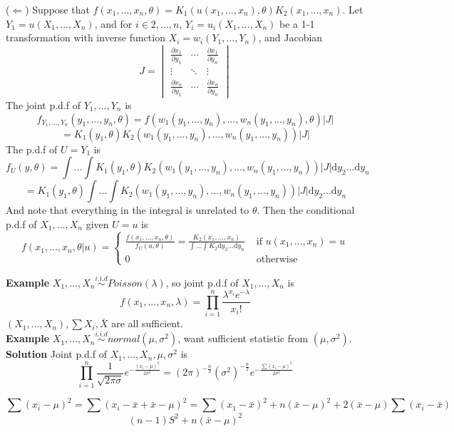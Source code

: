 \documentclass[a4paper,12pt]{article}
\begin{document}
($\Leftarrow$) Suppose that $f(x_1, ..., x_n, \theta) = K_1(u(x_1, ..., x_n), \theta)K_2(x_1, ..., x_n)$. Let $Y_1 = u(X_1, ..., X_n)$, and for $i \in 2, ..., n$,  $Y_i = u_i(X_1, ..., X_n)$ be a 1-1 transformation with inverse function $X_i = w_i(Y_1, ..., Y_n)$, and Jacobian
$$J = \begin{vmatrix}
\frac{\partial x_1}{\partial y_1} & \cdots & \frac{\partial x_1}{\partial y_n}\\
\vdots & \ddots & \vdots\\
\frac{\partial x_n}{\partial y_1} & \cdots & \frac{\partial x_n}{\partial y_n}
\end{vmatrix}$$
The joint p.d.f of $Y_1, ..., Y_n$ is
$$f_{Y_1, ..., Y_n}(y_1, ..., y_n, \theta) = f( w_1(y_1, ..., y_n), ..., w_n(y_1, ..., y_n), \theta )|J|$$
$$= K_1(y_1, \theta)K_2(w_1(y_1, ..., y_n), ..., w_n(y_1, ..., y_n) )|J|$$
The p.d.f of $U = Y_1$ is
$$f_U(y, \theta) = \int...\int K_1(y_1, \theta)K_2(w_1(y_1, ..., y_n), ..., w_n(y_1, ..., y_n) )|J|\mathrm{d}y_2...\mathrm{d}y_n$$
$$= K_1(y_1, \theta) \int...\int K_2(w_1(y_1, ..., y_n), ..., w_n(y_1, ..., y_n) )|J|\mathrm{d}y_2...\mathrm{d}y_n$$
And note that everything in the integral is unrelated to $\theta$. Then the conditional p.d.f of $X_1, ..., X_n$ given $U=u$ is
$$f(x_1, ..., x_n, \theta | u) = 
\begin{cases}
\frac{f(x_1, ..., x_n, \theta)}{f_U(u, \theta)} = \frac{K_2(x_1, ..., x_n)}{\int...\int K_2\mathrm{d}y_2...\mathrm{d}y_n} & \text{ if } u(x_1, ..., x_n) = u\\
0 & \text{ otherwise }
\end{cases}$$ 

\textbf{Example} $X_1, ..., X_n \overset{i.i.d}{\sim} Poisson(\lambda)$, so joint p.d.f of $X_1, ..., X_n$ is
$$f(x_1, ..., x_n, \lambda) = \prod_{i=1}^n \frac{\lambda^{x_i} e^{-\lambda}}{x_i!}$$
$(X_1, ..., X_n), \sum X_i, \bar{X}$ are all sufficient.\\

\textbf{Example} $X_1, ..., X_n \overset{i.i.d}{\sim} normal(\mu, \sigma^2)$, want sufficient statistic from $(\mu, \sigma^2)$.\\

\textbf{Solution} Joint p.d.f of $X_1, ..., X_n, \mu, \sigma^2$ is
$$\prod_{i=1}^n \frac{1}{\sqrt{2\pi\sigma}}e^{-\frac{(x_i-\mu)^2}{2\sigma^2}} = (2\pi)^{-\frac{n}{2}}(\sigma^2)^{-\frac{n}{2}}e^{-\frac{\sum(x_i-\mu)^2}{2\sigma^2}}$$

$$\sum(x_i-\mu)^2 = \sum(x_i-\bar{x}+\bar{x}-\mu)^2 = \sum(x_1-\bar{x})^2 + n(\bar{x}-\mu)^2+2(\bar{x}-\mu)\sum(x_i-\bar{x})$$
$$(n-1)S^2+n(\bar{x}-\mu)^2$$
\end{document}
